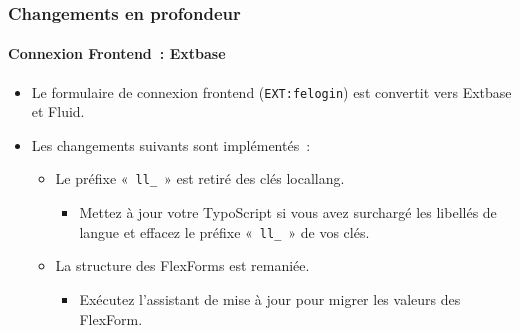 \begin{frame}[fragile]
	\frametitle{Changements en profondeur}
	\framesubtitle{Connexion Frontend~: Extbase}

	\begin{itemize}
		\item Le formulaire de connexion frontend (\texttt{EXT:felogin}) est convertit vers Extbase et Fluid.

		\item Les changements suivants sont implémentés~:

		\begin{itemize}
			\item[\ding{202}] Le préfixe «~\texttt{ll\_}~» est retiré des clés locallang.

				\begin{itemize}
					\item[\ding{228}] Mettez à jour votre TypoScript si vous avez surchargé les libellés de langue et effacez le préfixe «~\texttt{ll\_}~» de vos clés.
				\end{itemize}

			\item[\ding{203}] La structure des FlexForms est remaniée.

				\begin{itemize}
					\item[\ding{228}] Exécutez l'assistant de mise à jour pour migrer les valeurs des FlexForm.
				\end{itemize}

		\end{itemize}

	\end{itemize}

\end{frame}


